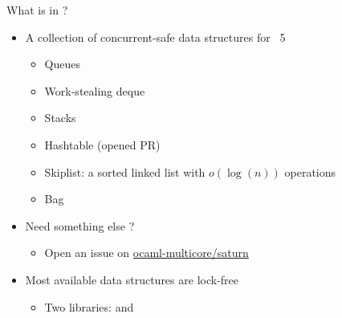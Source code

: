 \begin{frame}{What is in \Saturn ?}
    \begin{itemize}[label=$\bullet$]
        \item A collection of concurrent-safe data structures for \OCaml~5
        \begin{itemize}[label=$\diamond$]
           \item Queues
            \item<4-> Work-stealing deque
            \item<4-> Stacks 
            \item<4-> Hashtable (opened PR)
            \item<4-> Skiplist: a sorted linked list with $o(\log(n))$ operations
            \item<4-> Bag
        \end{itemize}
        \item<5-> Need something else ? 
        \begin{itemize}[label=$\rightarrow$]
            \item Open an issue on  \href{https://github.com/ocaml-multicore/saturn}{ocaml-multicore/saturn}
        \end{itemize}
        \item<6-> Most available data structures are lock-free 
        \begin{itemize}[label=$\rightarrow$]
            \item<6-> Two libraries: \Saturn and \Saturnlf
        \end{itemize}
    \end{itemize}
 \end{frame}


